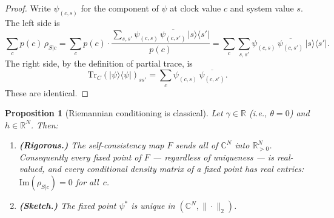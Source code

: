 \documentclass[12pt,a4paper]{article}
\newtheorem{proposition}{Proposition}
\theoremstyle{definition}
\theoremstyle{remark}
\begin{document}
\begin{proof}
Write $\psi_{(c,s)}$ for the component of $\psi$ at clock value $c$
and system value $s$. The left side is
\[
\sum_c p(c)\,\rho_{S|c} = \sum_c p(c) \cdot
\frac{\sum_{s,s'} \psi_{(c,s)}\,\overline{\psi_{(c,s')}}\,
|s\rangle\langle s'|}{p(c)}
= \sum_c \sum_{s,s'} \psi_{(c,s)}\,\overline{\psi_{(c,s')}}\,
|s\rangle\langle s'|.
\]
The right side, by the definition of partial trace, is
\[
\mathrm{Tr}_C(|\psi\rangle\langle\psi|)_{ss'}
= \sum_c \psi_{(c,s)}\,\overline{\psi_{(c,s')}}.
\]
These are identical.
\end{proof}

\begin{proposition}[Riemannian conditioning is classical]
\label{prop:riem_classical}
Let $\gamma \in \mathbb{R}$ (i.e., $\theta = 0$) and $h \in
\mathbb{R}^N$. Then:
\begin{enumerate}
\item[(a)] \textbf{(Rigorous.)} The self-consistency map $F$ sends all of
$\mathbb{C}^N$ into $\mathbb{R}^N_{>0}$. Consequently \emph{every} fixed
point of $F$ --- regardless of uniqueness --- is real-valued, and every
conditional density matrix of a fixed point has real entries:
$\mathrm{Im}(\rho_{S|c}) = 0$ for all~$c$.
\item[(b)] \textbf{(Sketch.)} The fixed point $\psi^*$ is unique in
$(\mathbb{C}^N, \|\cdot\|_2)$.
\end{enumerate}
\end{proposition}
\end{document}
